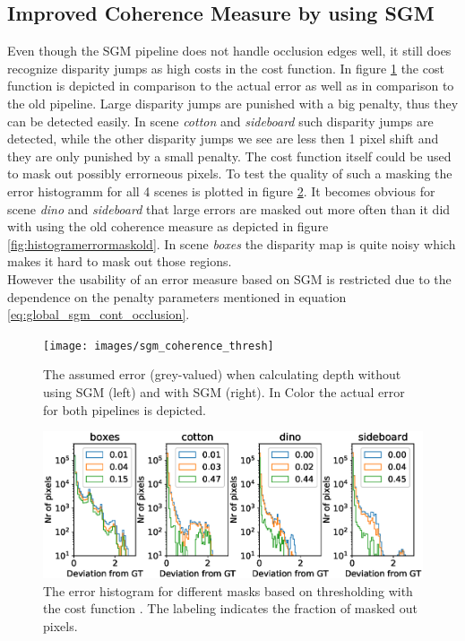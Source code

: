 \documentclass  [
  paper    = a4,
  BCOR     = 10mm,
  twoside,
  fontsize = 12pt,
  fleqn,
  toc      = bibnumbered,
  toc      = listofnumbered,
  numbers  = noendperiod,
  headings = normal,
  listof   = leveldown,
  version  = 3.03
]                                       {scrreprt}
\begin{document}
\subsection*{Improved Coherence Measure by using SGM}
Even though the SGM pipeline does not handle occlusion edges well, it still does recognize disparity jumps as high costs in the cost function. In figure \ref{fig:sgmcoherencethresh} the cost function is depicted in comparison to the actual error as well as in comparison to the old pipeline. Large disparity jumps are punished with a big penalty, thus they can be detected easily. In scene \textit{cotton} and \textit{sideboard} such disparity jumps are detected, while the other disparity jumps we see are less then 1 pixel shift and they are only punished by a small penalty. The cost function itself could be used to mask out possibly errorneous pixels. To test the quality of such a masking the error histogramm for all 4 scenes is plotted in figure \ref{fig:histogramerrormasksgm}. It becomes obvious for scene \textit{dino} and \textit{sideboard} that large errors are masked out more often than it did with using the old coherence measure as depicted in figure \ref{fig:histogramerrormaskold}. In scene \textit{boxes} the disparity map is quite noisy which makes it hard to mask out those regions.\\
 However the usability of an error measure based on SGM is restricted due to the dependence on the penalty parameters mentioned in equation \ref{eq:global_sgm_cont_occlusion}.

\begin{figure}
	\centering
	\texttt{[image: images/sgm\_coherence\_thresh]}
	\caption[SGM Coherence measure]{The assumed error (grey-valued) when calculating depth without using SGM (left) and with SGM (right). In Color the actual error for both pipelines is depicted.}
	\label{fig:sgmcoherencethresh}
\end{figure}



\begin{figure}
	\centering
	\includegraphics[width=1\linewidth]{images/histogram_error_mask_sgm}
	\caption[Histogram when masking errors with new error map]{The error histogram for different masks based on thresholding with the cost function . The labeling indicates the fraction of masked out pixels.}
	\label{fig:histogramerrormasksgm}
\end{figure}
\end{document}

